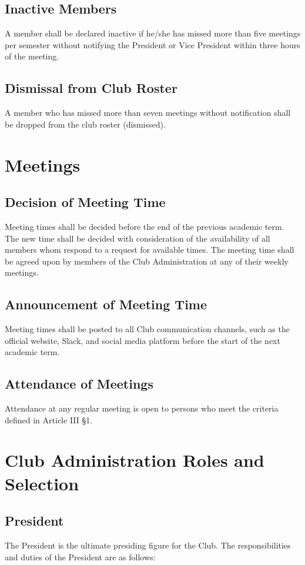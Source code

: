 \documentclass[english,11pt]{article}
\begin{document}
\subsection{Inactive Members}
A member shall be declared inactive if he/she has missed more than five meetings per semester without notifying the President or Vice President within three hours of the meeting.

\subsection{Dismissal from Club Roster}
A member who has missed more than seven meetings without notification shall be dropped from the club roster (dismissed).

\section{Meetings}
\subsection{Decision of Meeting Time}
Meeting times shall be decided before the end of the previous academic term.
The new time shall be decided with consideration of the availability of all members whom respond to a request for available times.
The meeting time shall be agreed upon by members of the Club Administration at any of their weekly meetings.

\subsection{Announcement of Meeting Time}
Meeting times shall be posted to all Club communication channels, such as the official website, Slack, and social media platform before the start of the next academic term.

\subsection{Attendance of Meetings}
Attendance at any regular meeting is open to persons who meet the criteria defined in Article III §1.

\section{Club Administration Roles and Selection}
\subsection{President}
The President is the ultimate presiding figure for the Club.
The responsibilities and duties of the President are as follows:
\end{document}
